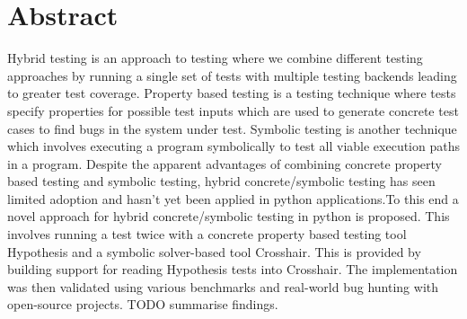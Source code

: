 \chapter*{Abstract}
\vspace{-1em}
Hybrid testing is an approach to testing where we combine different testing approaches by running a single set of tests with multiple testing backends leading to greater test coverage. Property based testing is a testing technique where tests specify properties for possible test inputs which are used to generate concrete test cases to find bugs in the system under test. Symbolic testing is another technique which involves executing a program symbolically to test all viable execution paths in a program. Despite the apparent advantages of combining concrete property based testing and symbolic testing, hybrid concrete/symbolic testing has seen limited adoption and hasn’t yet been applied in python applications.To this end a novel approach for hybrid concrete/symbolic testing in python is proposed. This involves running a test twice with a concrete property based testing tool Hypothesis and a symbolic solver-based tool Crosshair. This is provided by building support for reading Hypothesis tests into Crosshair. The implementation was then validated using various benchmarks and real-world bug hunting with open-source projects. TODO summarise findings.


